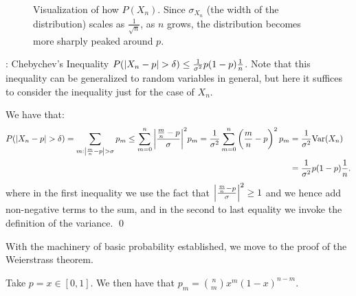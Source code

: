 \begin{figure}[htbp]
    \centering
    
    \caption{Visualization of how $P(X_n)$. Since $\sigma_{X_n}$ (the width of the distribution) scales as $\frac{1}{\sqrt{n}}$, as $n$ grows, the distribution becomes more sharply peaked around $p$.}
    \label{fig47}
\end{figure}

\begin{ntheorem}{: Chebychev's Inequality}{}
    $P(\abs{X_n - p} > \delta) \leq \frac{1}{\sigma^2}p(1-p)\frac{1}{n}$. Note that this inequality can be generalized to random variables in general, but here it suffices to consider the inequality just for the case of $X_n$.
\end{ntheorem}
\begin{nproof}
    We have that:
    \begin{align*}
        P(\abs{X_n - p} > \delta) = \sum_{m: \abs{\frac{m}{n} - p} > \sigma}p_m \leq \sum_{m=0}^n \abs{\frac{\frac{m}{n} - p}{\sigma}}^2p_m = \frac{1}{\sigma^2}\sum_{m=0}^n \left(\frac{m}{n} - p\right)^2p_m &= \frac{1}{\sigma^2}\text{Var}(X_n) 
        \\ &= \frac{1}{\sigma^2}p(1-p)\frac{1}{n}.
    \end{align*}
    where in the first inequality we use the fact that $\abs{\frac{\frac{m}{n} - p}{\sigma}}^2 \geq 1$ and we hence add non-negative terms to the sum, and in the second to last equality we invoke the definition of the variance. \qed
\end{nproof}
\noindent With the machinery of basic probability established, we move to the proof of the Weierstrass theorem.

\begin{nproof}
    Take $p = x \in [0, 1]$. We then have that $p_m = \binom{n}{m}x^m(1-x)^{n-m}$. 
\end{nproof}


